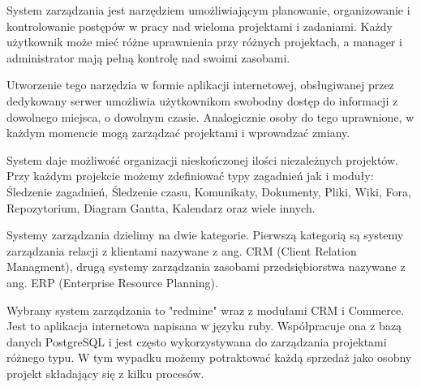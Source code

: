 \par System zarządzania jest narzędziem umożliwiającym planowanie, organizowanie i kontrolowanie postępów w pracy nad wieloma projektami i zadaniami. Każdy użytkownik może mieć różne uprawnienia przy różnych projektach, a manager i administrator mają pełną kontrolę nad swoimi zasobami.
			\par Utworzenie tego narzędzia w formie aplikacji internetowej, obsługiwanej przez dedykowany serwer umożliwia użytkownikom swobodny dostęp do informacji z dowolnego miejsca, o dowolnym czasie. Analogicznie osoby do tego uprawnione, w każdym momencie mogą zarządzać projektami i wprowadzać zmiany.
			\par System daje możliwość organizacji nieskończonej ilości niezależnych projektów. Przy każdym projekcie możemy zdefiniować typy zagadnień jak i moduły: Śledzenie zagadnień, Śledzenie czasu, Komunikaty, Dokumenty, Pliki, Wiki, Fora, Repozytorium, Diagram Gantta, Kalendarz oraz wiele innych.
			\par Systemy zarządzania dzielimy na dwie kategorie. Pierwszą kategorią są systemy zarządzania relacji z klientami nazywane z ang. CRM (Client Relation Managment), drugą systemy zarządzania zasobami przedsiębiorstwa nazywane z ang. ERP (Enterprise Resource Planning).
			\par Wybrany system zarządzania to "redmine" wraz z modułami CRM i Commerce. Jest to aplikacja internetowa napisana w języku ruby. Współpracuje ona z bazą danych PostgreSQL i jest często wykorzystywana do zarządzania projektami różnego typu. W tym wypadku możemy potraktować każdą sprzedaż jako osobny projekt składający się z kilku procesów.

			
 
